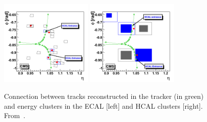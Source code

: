 \begin{figure}[!Hhtbp]
  \begin{center}
    \includegraphics[width=0.4\textwidth]{figs/Conection_tracks_Ecalcluster.png}
    \includegraphics[width=0.4\textwidth]{figs/Conection_tracks_Hcalcluster.png}
    \caption{Connection between tracks reconstructed in the tracker (in green) and energy clusters in the ECAL [left] and HCAL clusters [right]. From~\cite{Brochet:1956723}.}
    \label{fig:SubdetConec}
  \end{center}
\end{figure}
%
%
